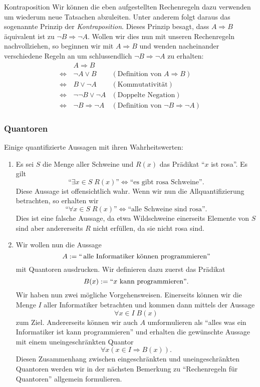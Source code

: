 \begin{example2}{Kontraposition}
Wir können die eben aufgestellten Rechenregeln dazu verwenden um wiederum neue Tatsachen abzuleiten. Unter anderem folgt daraus das sogenannte Prinzip der \textit{Kontraposition}. Dieses Prinzip besagt, dass $A\Rightarrow B$ äquivalent ist zu $\neg B\Rightarrow\neg A$. Wollen wir dies nun mit unseren Rechenregeln nachvollziehen, so beginnen wir mit $A\Rightarrow B$ und wenden nacheinander verschiedene Regeln an um schlussendlich $\neg B\Rightarrow \neg A$ zu erhalten:
\begin{align*}
                     &A\Rightarrow B\\
   \Leftrightarrow\, &\neg A\lor B                  &(\text{Definition von }A\Rightarrow B)\\
   \Leftrightarrow\, &B\lor \neg A                  &(\text{Kommutativität})\\
   \Leftrightarrow\, &\neg\neg B\lor\neg A          &(\text{Doppelte Negation})\\
   \Leftrightarrow\, &\neg B\Rightarrow \neg A      &(\text{Definition von }\neg B\Rightarrow\neg A)
\end{align*}
\end{example2}

\subsubsection{Quantoren}

\begin{example}
 Einige quantifizierte Aussagen mit ihren Wahrheitswerten:
\begin{enumerate}
 \item Es sei $S$ die Menge aller Schweine und $R(x)$ das Prädikat ``$x$ ist rosa''. Es gilt
\[
 \text{``}\exists x\in S\; R(x)\text{''}\Leftrightarrow\text{``es gibt rosa Schweine''}.
\]
Diese Aussage ist offensichtlich wahr. Wenn wir nun die Allquantifizierung betrachten, so erhalten wir
\[
 \text{``}\forall x\in S\; R(x)\text{''}\Leftrightarrow\text{``alle Schweine sind rosa''}.
\]
Dies ist eine falsche Aussage, da etwa Wildschweine einerseits Elemente von $S$ sind aber andererseits $R$ nicht erfüllen, da sie nicht rosa sind.
\item Wir wollen nun die Aussage
\[
A:=``\,\text{alle Informatiker können programmieren''}
\]
mit Quantoren ausdrucken.
Wir definieren dazu zuerst das Prädikat
\[
B(x):=``x\text{ kann programmieren''}.
\]
Wir haben nun zwei mögliche Vorgehensweisen. Einerseits können wir die Menge $I$ aller Informatiker betrachten und kommen dann mittels der Aussage
\[
 \forall x\in I\;B(x)
\]
zum Ziel. Andererseits können wir auch $A$ umformulieren als ``alles was ein Informatiker ist kann programmieren'' und erhalten die gewünschte Aussage mit einem uneingeschränkten Quantor
\[
 \forall x(x\in I\Rightarrow B(x)).
\]
Diesen Zusammenhang zwischen eingeschränkten und uneingeschränkten Quantoren werden wir in der nächsten Bemerkung zu ``Rechenregeln für Quantoren'' allgemein formulieren.
\end{enumerate}
\end{example}

